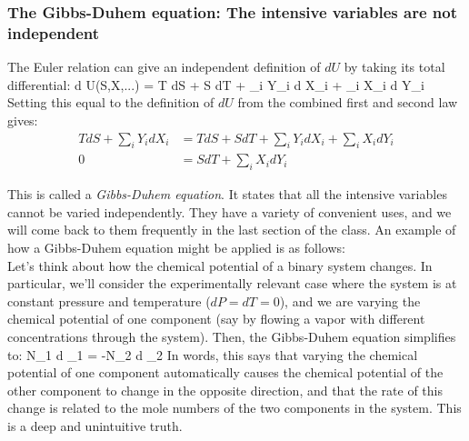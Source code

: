 \documentclass[12pt]{article}
\begin{document}




\subsubsection{The Gibbs-Duhem equation: The intensive variables are not independent}
The Euler relation can give an independent definition of $dU$ by taking its total differential:
\eqs
d U(S,X,...) = T dS + S dT + \sum_i Y_i d X_i + \sum_i X_i d Y_i 
\eqe
Setting this equal to the definition of $dU$ from the combined first and second law gives:
\begin{align*}
TdS + \sum_i Y_i dX_i&=T dS + S dT + \sum_i Y_i d X_i + \sum_i X_i d Y_i \\
0 &=S dT + \sum_i X_i d Y_i
\end{align*} 

This is called a \emph{Gibbs-Duhem equation}. It states that all the intensive variables cannot be varied independently. They have a variety of convenient uses, and we will come back to them frequently in the last section of the class. An example of how a Gibbs-Duhem equation might be applied is as follows:\\

Let's think about how the chemical potential of a binary system changes. In particular, we'll consider the experimentally relevant case where the system is at constant pressure and temperature ($dP=dT=0$), and we are varying the chemical potential of one component (say by flowing a vapor with different concentrations through the system). Then, the Gibbs-Duhem equation simplifies to:
\eqs N_1 d \mu_1 = -N_2 d \mu_2 \eqe
In words, this says that varying the chemical potential of one component automatically causes the chemical potential of the other component to change in the opposite direction, and that the rate of this change is related to the mole numbers  of the two components in the system. This is a deep and unintuitive truth.
\end{document}
